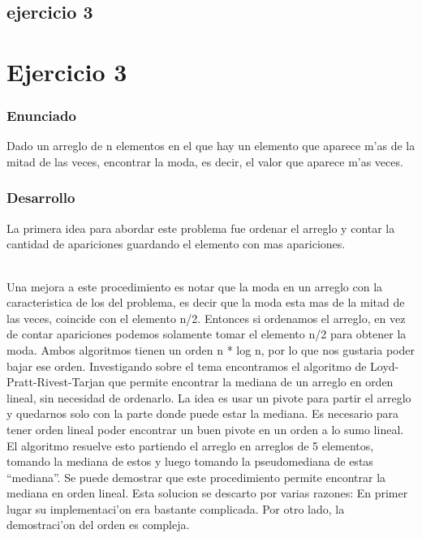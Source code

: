 \chapter{ejercicio 3}
\part{Ejercicio 3}
\section{Enunciado}
Dado un arreglo de n elementos en el que hay un elemento que aparece m'as de la mitad de las veces, encontrar la moda, es
decir, el valor que aparece m'as veces.

\section{Desarrollo}
La primera idea para abordar este problema fue ordenar el arreglo y contar la cantidad de apariciones guardando el elemento con mas apariciones.
\paragraph{}
Una mejora a este procedimiento es notar que la moda en un arreglo con la caracteristica de los del problema, es decir que la 
moda esta mas de la mitad de las veces, coincide con el elemento n/2. Entonces si ordenamos el arreglo, en 
vez de contar apariciones podemos solamente tomar el elemento n/2  para obtener la moda. Ambos algoritmos tienen un orden n * 
log n, por lo que nos gustaria poder bajar ese orden. Investigando sobre el tema encontramos el algoritmo de 
Loyd-Pratt-Rivest-Tarjan que permite encontrar la mediana de un arreglo en orden lineal, sin necesidad de ordenarlo. La idea es 
usar un pivote para partir el arreglo y quedarnos solo con la parte donde puede estar la mediana. Es necesario para tener orden 
lineal poder encontrar un buen pivote en un orden a lo sumo lineal. El algoritmo resuelve esto partiendo el arreglo en arreglos 
de 5 elementos, tomando la mediana de estos y luego tomando la pseudomediana de estas ``mediana''.  Se puede demostrar que este 
procedimiento permite encontrar la mediana en orden lineal. Esta solucion se descarto por varias razones: En primer lugar su 
implementaci'on era bastante complicada. Por otro lado, la demostraci'on del orden es compleja.
